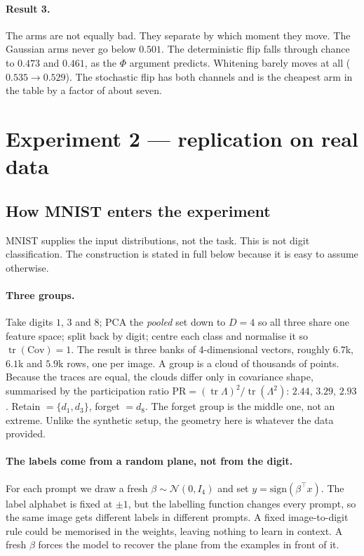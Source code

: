 \documentclass[11pt,a4paper]{article}
\begin{document}
\paragraph{Result 3.} The arms are not equally bad. They separate by which
moment they move. The Gaussian arms never go below $0.501$. The deterministic
flip falls through chance to $0.473$ and $0.461$, as the $\Phi$ argument
predicts. Whitening barely moves at all ($0.535\to0.529$). The stochastic flip
has both channels and is the cheapest arm in the table by a factor of about
seven.

\section{Experiment 2 — replication on real data}

\subsection*{How MNIST enters the experiment}

MNIST supplies the input distributions, not the task. This is not digit
classification. The construction is stated in full below because it is easy to
assume otherwise.

\paragraph{Three groups.} Take digits $1$, $3$ and $8$; PCA the \emph{pooled}
set down to $D=4$ so all three share one feature space; split back by digit;
centre each class and normalise it so $\operatorname{tr}(\mathrm{Cov})=1$. The
result is three banks of 4-dimensional vectors, roughly $6.7$k, $6.1$k and
$5.9$k rows, one per image. A group is a cloud of thousands of points. Because
the traces are equal, the clouds differ only in covariance shape, summarised by
the participation ratio
$\mathrm{PR}=(\operatorname{tr}\Lambda)^2/\operatorname{tr}(\Lambda^2)$:
$2.44$, $3.29$, $2.93$. Retain $=\{d_1,d_3\}$, forget $=d_8$. The forget group
is the middle one, not an extreme. Unlike the synthetic setup, the geometry
here is whatever the data provided.

\paragraph{The labels come from a random plane, not from the digit.} For each
prompt we draw a fresh $\beta\sim\mathcal N(0,I_4)$ and set
$y=\mathrm{sign}(\beta^{\!\top}x)$. The label alphabet is fixed at $\pm1$, but
the labelling function changes every prompt, so the same image gets different
labels in different prompts. A fixed image-to-digit rule could be memorised in
the weights, leaving nothing to learn in context. A fresh $\beta$ forces the
model to recover the plane from the examples in front of it.
\end{document}
